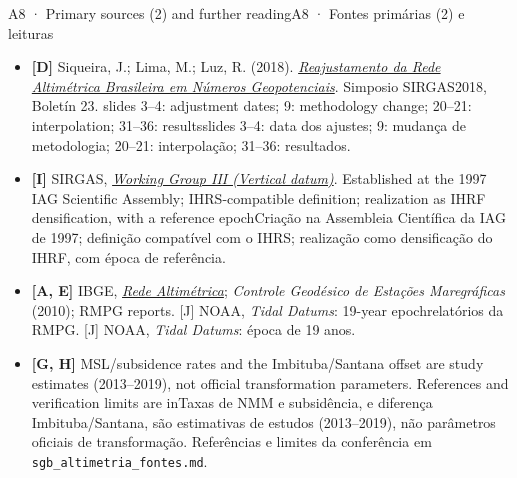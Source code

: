 \documentclass[aspectratio=169,11pt]{beamer}
\newcommand{\tr}[2]{\ifEN#2\else#1\fi}
\begin{document}
\begin{frame}{\tr{A8 · Fontes primárias (2) e leituras}{A8 · Primary sources (2) and further reading}}
  \scriptsize
  \begin{itemize}
    \setlength{\itemsep}{5pt}
    \item \textbf{[D]} Siqueira, J.; Lima, M.; Luz, R. (2018).
    \href{https://sirgas.ipgh.org/docs/Boletines/Bol23/32_Siqueira_et_al_2018_Repro_red_vertical_Brasil.pdf}{\emph{Reajustamento da Rede Altimétrica Brasileira em Números Geopotenciais}}.
    Simposio SIRGAS2018, Boletín 23.
    \tr{slides 3--4: data dos ajustes; 9: mudança de metodologia; 20--21: interpolação;
    31--36: resultados}{slides 3--4: adjustment dates; 9: methodology change;
    20--21: interpolation; 31--36: results}.

    \item \textbf{[I]} SIRGAS,
    \href{https://sirgas.ipgh.org/en/organization/working-groups/working-group-iii/}{\emph{Working Group III (Vertical datum)}}.
    \tr{Criação na Assembleia Científica da IAG de 1997; definição compatível com o IHRS;
    realização como densificação do IHRF, com época de referência}{
    Established at the 1997 IAG Scientific Assembly; IHRS-compatible definition;
    realization as IHRF densification, with a reference epoch}.

    \item \textbf{[A, E]} IBGE,
    \href{https://www.ibge.gov.br/geociencias/informacoes-sobre-posicionamento-geodesico/rede-geodesica/16283-rede-altimetrica.html}{\emph{Rede Altimétrica}};
    \emph{Controle Geodésico de Estações Maregráficas} (2010);
    \tr{relatórios da RMPG. [J] NOAA, \emph{Tidal Datums}: época de 19 anos}{
    RMPG reports. [J] NOAA, \emph{Tidal Datums}: 19-year epoch}.

    \item \textbf{[G, H]} \tr{Taxas de NMM e subsidência, e diferença Imbituba/Santana,
    são estimativas de estudos (2013--2019), não parâmetros oficiais de transformação.
    Referências e limites da conferência em}{MSL/subsidence rates and the Imbituba/Santana
    offset are study estimates (2013--2019), not official transformation parameters.
    References and verification limits are in} \texttt{sgb\_altimetria\_fontes.md}.
  \end{itemize}
\end{frame}
\end{document}
